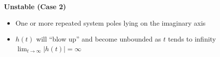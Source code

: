 \documentclass[landscape,a4paper]{extarticle}
\newenvironment{Figure}
  {\noindent\minipage{\linewidth}}
  {\endminipage\par\medskip}
\begin{document}
\begin{multicols*}{5}









    \textbf{Unstable (Case 2)}
    \begin{itemize}
        \item One or more repeated system poles lying on the imaginary axis
        \item $h(t)$ will ``blow up'' and become unbounded as $t$ tends to infinity\\
        $\lim_{t \to \infty}|h(t)| = \infty$
    \end{itemize}











\end{multicols*}
\end{document}
